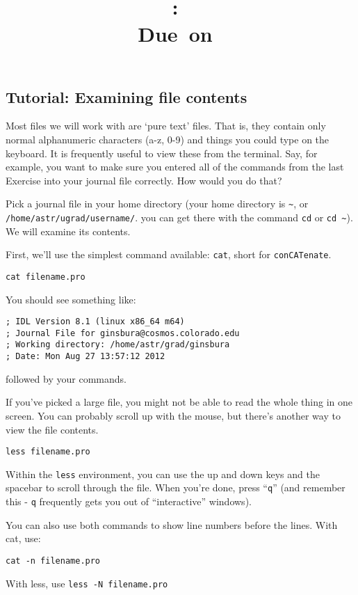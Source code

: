 \documentclass{article}
\title{\vspace{2in}\textmd{\textbf{\hmwkClass:\ \hmwkTitle}}\\\normalsize\vspace{0.1in}\small{Due\ on\ \hmwkDueDate}\\\vspace{0.1in}\large{}\vspace{3in}}
\date{}
\begin{document}
\begin{spacing}{1.0}
\newpage



\section{Tutorial: Examining file contents}

Most files we will work with are `pure text' files.  That is, they contain only
normal alphanumeric characters (a-z, 0-9) and things you could type on the
keyboard.  It is frequently useful to view these from the terminal.  Say, for example,
you want to make sure you entered all of the commands from the last Exercise into your
journal file correctly.  How would you do that?

Pick a journal file in your home directory (your home directory is \verb|~|, or
\verb|/home/astr/ugrad/username/|.  you can get there with the command
\verb|cd| or \verb|cd ~|).  We will examine its contents.

First, we'll use the simplest command available: \verb|cat|, short for \verb|conCATenate|.

\verb|cat filename.pro|

You should see something like:
\begin{verbatim}
; IDL Version 8.1 (linux x86_64 m64)
; Journal File for ginsbura@cosmos.colorado.edu
; Working directory: /home/astr/grad/ginsbura
; Date: Mon Aug 27 13:57:12 2012
\end{verbatim}
followed by your commands.

If you've picked a large file, you might not be able to read the whole thing in
one screen.  You can probably scroll up with the mouse, but there's another way 
to view the file contents.

\verb|less filename.pro|

Within the \verb|less| environment, you can use the up and down keys and the spacebar
to scroll through the file.  When you're done, press ``\verb|q|'' (and remember this - 
\verb|q| frequently gets you out of ``interactive'' windows).

You can also use both commands to show line numbers before the lines.  With cat, use:

\verb|cat -n filename.pro|

With less, use
\verb|less -N filename.pro|


\end{spacing}
\end{document}
